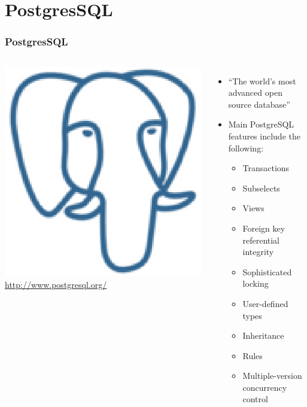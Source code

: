 \documentclass{beamer}
\begin{document}
\section{PostgresSQL}
\begin{frame}[fragile]
\frametitle{PostgresSQL}

\begin{columns}
\href{http://www.postgresql.org/}{\includegraphics[width=0.75 \textwidth]{postgreSQL300x300.eps}}
 \url{http://www.postgresql.org/}
\begin{itemize}
  \item ``The world's most advanced open source database''
  \item Main PostgreSQL features include the following:
  \begin{itemize}
    \item Transactions
    \item Subselects
    \item Views
    \item Foreign key referential integrity
    \item Sophisticated locking
    \item User-defined types
    \item Inheritance
    \item Rules
    \item Multiple-version concurrency control
  \end{itemize}

\end{itemize}
\end{columns}
\end{frame}
\end{document}
